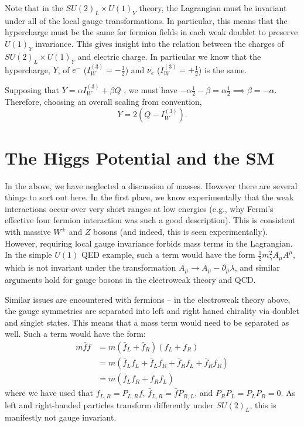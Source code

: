 Note that in the $SU(2)_L \times U(1)_{Y}$ theory, the Lagrangian must be invariant under all of the 
local gauge transformations. In particular, this means that the hypercharge must be the same for 
fermion fields in each weak doublet to preserve $U(1)_{Y}$ invariance. This gives insight 
into the relation between the charges of $SU(2)_L \times U(1)_{Y}$ and electric charge. In particular
we know that the hypercharge, $Y$, of $e^{-}$ ($I_W^{(3)} = -\frac{1}{2}$) and $\nu_{e}$ 
($I_W^{(3)} = +\frac{1}{2}$) is the same. 

Supposing that $Y=\alpha I_{W}^{(3)} + \beta Q$ , we must have
$-\alpha \frac{1}{2} - \beta = \alpha \frac{1}{2} \implies \beta = -\alpha$. Therefore, choosing 
an overall scaling from convention,
\begin{equation}
Y = 2(Q-I_{W}^{(3)}).
\end{equation}

\section{The Higgs Potential and the SM}
In the above, we have neglected a discussion of masses. However there are several things to sort out here.
In the first place, we know experimentally that the weak interactions occur over very short ranges at low 
energies (e.g., why Fermi's effective four fermion interaction was such a good description). This is consistent
with massive $W^{\pm}$ and $Z$ bosons (and indeed, this is seen experimentally). However, requiring local 
gauge invariance forbids mass terms in the Lagrangian. In the simple $U(1)$ QED example, such a term would have 
the form $\frac{1}{2}m_{\gamma}^2A_{\mu}A^{\mu}$, which is not invariant under the transformation $A_{\mu}\rightarrow A_{\mu}-\partial_{\mu}\lambda$, and similar arguments hold for gauge bosons in the electroweak theory and QCD.

Similar issues are encountered with fermions -- in the electroweak theory above, the gauge symmetries are 
separated into left and right haned chirality via doublet and singlet states. This means that a mass term 
would need to be separated as well. Such a term would have the form:
\begin{align}
m\bar{f}f &= m(\bar{f}_L+\bar{f}_R)(f_L+f_R)\\
&=m(\bar{f}_Lf_{L}+\bar{f}_{L}f_{R}+\bar{f}_{R}f_{L} + \bar{f}_{R}f_{R})\\
&=m(\bar{f}_{L}f_{R}+\bar{f}_{R}f_{L})
\end{align}
where we have used that $f_{L, R} = P_{L,R}f$, $\bar{f}_{L,R} = \bar{f}P_{R,L}$, and $P_{R}P_{L} = P_{L}P_{R} = 0$.
As left and right-handed particles transform differently under $SU(2)_{L}$, this is manifestly not gauge invariant.


